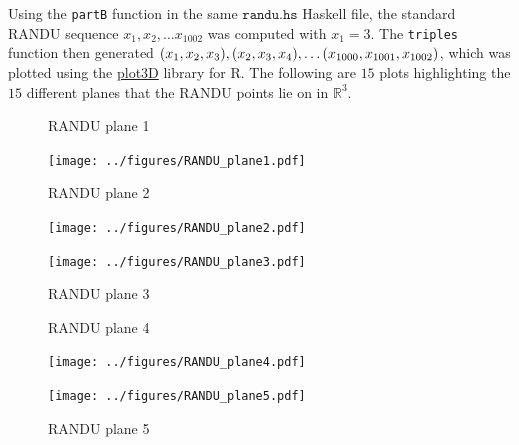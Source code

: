 \documentclass{article}
\DeclarePairedDelimiter \parens{(}{)}
\begin{document}
\begin{enumerate}
\begin{enumerate}
                Using the \texttt{partB} function in the same $\texttt{randu.hs}$ Haskell file,
                the standard RANDU sequence $x_1, x_2, \dots x_{1002}$ was computed with $x_1 = 3$.
                The \texttt{triples} function then generated $\parens*{x_1, x_2, x_3}, \parens*{x_2, x_3, x_4}, \dots \parens*{x_{1000}, x_{1001}, x_{1002}}$,
                which was plotted using the \href{https://cran.r-project.org/web/packages/plot3D/index.html}{plot3D} library for R.
                The following are $15$ plots highlighting the $15$ different planes that the RANDU points lie on in $\mathbb{R}^3$.
                \begin{figure}[H]
                    \centering
                    \begin{minipage}{.3\textwidth}
                        \centering
                        \caption{RANDU plane 1}
                        \texttt{[image: ../figures/RANDU\_plane1.pdf]}
                    \end{minipage}
                    \begin{minipage}{.3\textwidth}
                        \centering
                        \caption{RANDU plane 2}
                        \texttt{[image: ../figures/RANDU\_plane2.pdf]}
                    \end{minipage}
                    \begin{minipage}{.3\textwidth}
                        \centering
                        \caption{RANDU plane 3}
                        \texttt{[image: ../figures/RANDU\_plane3.pdf]}
                    \end{minipage}
                \end{figure}
                \begin{figure}[H]
                    \centering
                    \begin{minipage}{.3\textwidth}
                        \centering
                        \caption{RANDU plane 4}
                        \texttt{[image: ../figures/RANDU\_plane4.pdf]}
                    \end{minipage}
                    \begin{minipage}{.3\textwidth}
                        \centering
                        \caption{RANDU plane 5}
                        \texttt{[image: ../figures/RANDU\_plane5.pdf]}
                    \end{minipage}
                    \begin{minipage}{.3\textwidth}
                        \centering

\end{minipage}
\end{figure}
\end{enumerate}
\end{enumerate}
\end{document}
